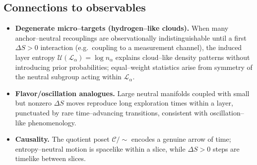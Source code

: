 \documentclass[11pt]{article}
\theoremstyle{plain}
\theoremstyle{definition}
\begin{document}

\subsection{Connections to observables}
\begin{itemize}
  \item \textbf{Degenerate micro–targets (hydrogen–like clouds).}
    When many anchor–neutral recouplings are observationally indistinguishable until a first $\Delta S>0$ interaction (e.g.\ coupling to a measurement channel), the induced layer entropy $\mathcal{U}(\mathcal{L}_\alpha)=\log n_\alpha$ explains cloud–like density patterns without introducing prior probabilities; equal–weight statistics arise from symmetry of the neutral subgroup acting within $\mathcal{L}_\alpha$.
  \item \textbf{Flavor/oscillation analogues.}
    Large neutral manifolds coupled with small but nonzero $\Delta S$ moves reproduce long exploration times within a layer, punctuated by rare time–advancing transitions, consistent with oscillation–like phenomenology.
  \item \textbf{Causality.}
    The quotient poset $\mathcal{C}/\!\sim$ encodes a genuine arrow of time; entropy–neutral motion is spacelike within a slice, while $\Delta S>0$ steps are timelike between slices.
\end{itemize}
\end{document}
